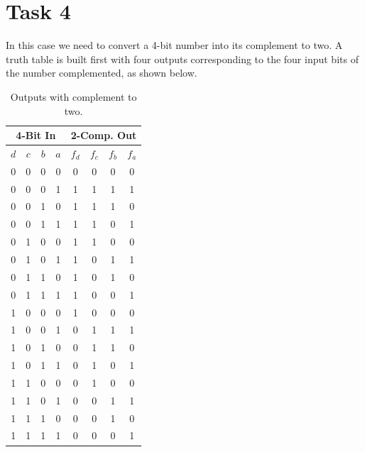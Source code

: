 


\newpage

\section*{Task 4}
    In this case we need to convert a 4-bit number into its complement 
    to two. A truth table is built first with four outputs corresponding 
    to the four input bits of the number complemented, as shown below.
    \begin{table}[H]
        \begin{center}
        \begin{tabular}{|c|c|c|c||c|c|c|c|}
        \hline
        \multicolumn{4}{|c||}{4-Bit In} & \multicolumn{4}{|c|}{2-Comp. Out}
        \\ \hline
        $d$ & $c$ & $b$ & $a$ & $f_{d}$ & $f_{c}$ & $f_{b}$ & $f_{a}$\\
        \hline \hline
        0 & 0 & 0 & 0 & 0 & 0 & 0 & 0\\ \hline
        0 & 0 & 0 & 1 & 1 & 1 & 1 & 1\\ \hline
        0 & 0 & 1 & 0 & 1 & 1 & 1 & 0\\ \hline
        0 & 0 & 1 & 1 & 1 & 1 & 0 & 1\\ \hline
        0 & 1 & 0 & 0 & 1 & 1 & 0 & 0\\ \hline
        0 & 1 & 0 & 1 & 1 & 0 & 1 & 1\\ \hline
        0 & 1 & 1 & 0 & 1 & 0 & 1 & 0\\ \hline
        0 & 1 & 1 & 1 & 1 & 0 & 0 & 1\\ \hline
        1 & 0 & 0 & 0 & 1 & 0 & 0 & 0\\ \hline
        1 & 0 & 0 & 1 & 0 & 1 & 1 & 1\\ \hline
        1 & 0 & 1 & 0 & 0 & 1 & 1 & 0\\ \hline
        1 & 0 & 1 & 1 & 0 & 1 & 0 & 1\\ \hline
        1 & 1 & 0 & 0 & 0 & 1 & 0 & 0\\ \hline
        1 & 1 & 0 & 1 & 0 & 0 & 1 & 1\\ \hline
        1 & 1 & 1 & 0 & 0 & 0 & 1 & 0\\ \hline
        1 & 1 & 1 & 1 & 0 & 0 & 0 & 1\\ \hline
        \end{tabular}
        \caption{Outputs with complement to two.}
        \end{center}
        \end{table}
